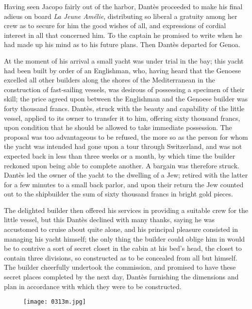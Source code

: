Having seen Jacopo fairly out of the harbor, Dantès proceeded to make
his final adieus on board \textit{La Jeune Amélie}, distributing so liberal a
gratuity among her crew as to secure for him the good wishes of all,
and expressions of cordial interest in all that concerned him. To the
captain he promised to write when he had made up his mind as to his
future plans. Then Dantès departed for Genoa.

At the moment of his arrival a small yacht was under trial in the bay;
this yacht had been built by order of an Englishman, who, having heard
that the Genoese excelled all other builders along the shores of the
Mediterranean in the construction of fast-sailing vessels, was desirous
of possessing a specimen of their skill; the price agreed upon between
the Englishman and the Genoese builder was forty thousand francs.
Dantès, struck with the beauty and capability of the little vessel,
applied to its owner to transfer it to him, offering sixty thousand
francs, upon condition that he should be allowed to take immediate
possession. The proposal was too advantageous to be refused, the more
so as the person for whom the yacht was intended had gone upon a tour
through Switzerland, and was not expected back in less than three weeks
or a month, by which time the builder reckoned upon being able to
complete another. A bargain was therefore struck. Dantès led the owner
of the yacht to the dwelling of a Jew; retired with the latter for a
few minutes to a small back parlor, and upon their return the Jew
counted out to the shipbuilder the sum of sixty thousand francs in
bright gold pieces.

The delighted builder then offered his services in providing a suitable
crew for the little vessel, but this Dantès declined with many thanks,
saying he was accustomed to cruise about quite alone, and his principal
pleasure consisted in managing his yacht himself; the only thing the
builder could oblige him in would be to contrive a sort of secret
closet in the cabin at his bed’s head, the closet to contain three
divisions, so constructed as to be concealed from all but himself. The
builder cheerfully undertook the commission, and promised to have these
secret places completed by the next day, Dantès furnishing the
dimensions and plan in accordance with which they were to be
constructed.

\begin{figure}[ht]
\texttt{[image: 0313m.jpg]}
\end{figure}

